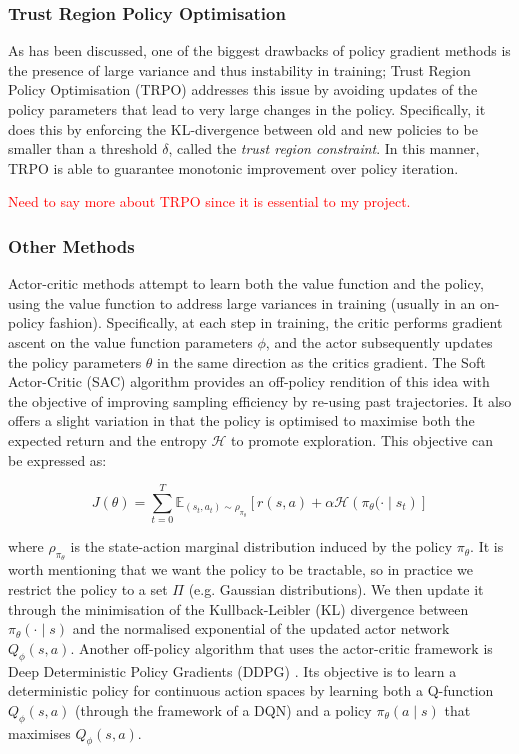\documentclass[12pt,twoside]{report}
\begin{document}
\smallskip

\subsubsection{Trust Region Policy Optimisation}

As has been discussed, one of the biggest drawbacks of policy gradient methods is the presence of large variance and thus instability in training; Trust Region Policy Optimisation (TRPO) \cite{trpo} addresses this issue by avoiding updates of the policy parameters that lead to very large changes in the policy. Specifically, it does this by enforcing the KL-divergence between old and new policies to be smaller than a threshold $\delta$, called the \textit{trust region constraint}. In this manner, TRPO is able to guarantee monotonic improvement over policy iteration.

\textcolor{red}{Need to say more about TRPO since it is essential to my project.}

\subsubsection{Other Methods}

Actor-critic methods \cite{actor-critic-algorithms} attempt to learn both the value function and the policy, using the value function to address large variances in training (usually in an on-policy fashion). Specifically, at each step in training, the critic performs gradient ascent on the value function parameters $\phi$, and the actor subsequently updates the policy parameters $\theta$ in the same direction as the critics gradient. The Soft Actor-Critic (SAC) \cite{SAC, PG-algorithms} algorithm provides an off-policy rendition of this idea with the objective of improving sampling efficiency by re-using past trajectories. It also offers a slight variation in that the policy is optimised to maximise both the expected return and the entropy $\mathcal{H}$ to promote exploration. This objective can be expressed as: 

\begin{equation}
    J(\theta) = \sum_{t=0}^{T} \mathbb{E}_{(s_t, a_t) \sim \rho_{\pi_\theta}} \left[r(s,a) + \alpha \mathcal{H}\left(\pi_\theta(\cdot \! \mid \! s_t\right)\right]
\end{equation}

\noindent where $\rho_{\pi_\theta}$ is the state-action marginal distribution induced by the policy $\pi_\theta$. It is worth mentioning that we want the policy to be tractable, so in practice we restrict the policy to a set $\Pi$ (e.g. Gaussian distributions). We then update it through the minimisation of the Kullback-Leibler (KL) divergence between $\pi_\theta (\cdot \! \mid \! s)$ and the normalised exponential of the updated actor network $Q_\phi(s,a)$. Another off-policy algorithm that uses the actor-critic framework is Deep Deterministic Policy Gradients (DDPG) \cite{DDPG}. Its objective is to learn a deterministic policy for continuous action spaces by learning both a Q-function $Q_\phi(s,a)$ (through the framework of a DQN) and a policy $\pi_\theta \! \left(a \! \mid \! s\right)$ that maximises $Q_\phi(s,a)$. 
\end{document}
